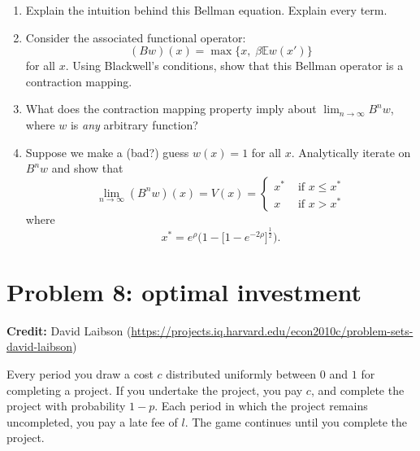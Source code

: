 \documentclass[11pt]{extarticle}
\theoremstyle{plain}
\theoremstyle{definition}
\begin{document}
\vspace{5mm}
\begin{enumerate}
\item Explain the intuition behind this Bellman equation. Explain every term.

\item Consider the associated functional operator:
\begin{equation*}
	(Bw)(x) = \max \bigg\{ x, \; \beta \mathbb E w(x') \bigg\}
\end{equation*}
for all $x$. Using Blackwell's conditions, show that this Bellman operator is a contraction mapping. 

\item What does the contraction mapping property imply about $\lim_{n \to \infty} B^n w$, where $w$ is \textit{any} arbitrary function? 

\item Suppose we make a (bad?) guess $w(x) = 1$ for all $x$. Analytically iterate on $B^n w$ and show that 
\begin{equation*}
	\lim_{n \to \infty} (B^n w) (x) = V(x) = \begin{cases}
		x^* & \text { if } x \leq x^* \\
		x & \text { if } x > x^*
	\end{cases}
\end{equation*}
where
\begin{equation*}
	x^* = e^\rho \bigg( 1 - \Big[ 1 - e^{- 2 \rho} \Big]^\frac{1}{2} \bigg).
\end{equation*}
\end{enumerate}


\vspace{10mm}
\section*{Problem 8: optimal investment}

\textbf{Credit:} David Laibson (\url{https://projects.iq.harvard.edu/econ2010c/problem-sets-david-laibson})

\vspace{5mm}
\noindent
Every period you draw a cost $c$ distributed uniformly between $0$ and $1$ for completing a project. If you undertake the project, you pay $c$, and complete the project with probability $1-p$. Each period in which the project remains uncompleted, you pay a late fee of $l$. The game continues until you complete the project.
\end{document}
